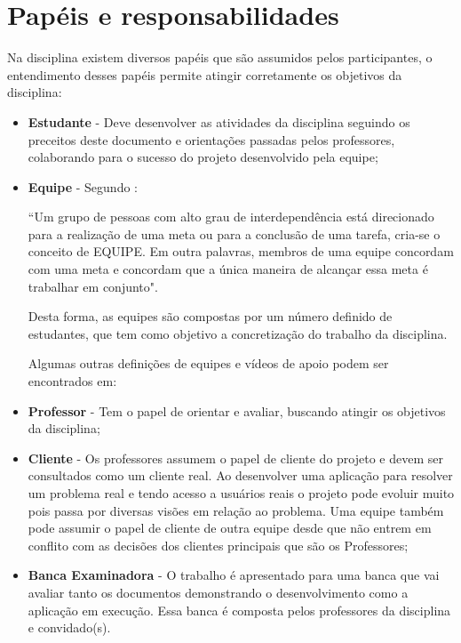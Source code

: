 \section{Papéis e responsabilidades}

Na disciplina existem diversos papéis que são assumidos pelos participantes, o entendimento desses papéis permite atingir corretamente os objetivos da disciplina:
\begin{itemize}
    \item \textbf{Estudante} - Deve desenvolver as atividades da disciplina seguindo os preceitos deste documento e orientações passadas pelos professores, colaborando para o sucesso do projeto desenvolvido pela equipe;


    \item \textbf{Equipe} - Segundo \cite{EQUIPES}: 
    \begin{citacao}“Um grupo de pessoas com alto grau de interdependência está direcionado para a realização de uma meta ou para a conclusão de uma tarefa, cria-se o conceito de EQUIPE. Em outra palavras, membros de uma equipe concordam com uma meta e concordam que a única maneira de alcançar essa meta é trabalhar em conjunto". 
    \end{citacao}
    Desta forma, as equipes são compostas por um número definido de estudantes, que tem como objetivo a concretização do trabalho da disciplina.
    
    Algumas outras definições de equipes e vídeos de apoio podem ser encontrados em: 
    

    \item \textbf{Professor} - Tem o papel de orientar e avaliar, buscando atingir os objetivos da disciplina;
    
    

    \item \textbf{Cliente} - Os professores assumem o papel de cliente do projeto e devem ser consultados como um cliente real. Ao desenvolver uma aplicação para resolver um problema real e tendo acesso a usuários reais o projeto pode evoluir muito pois passa por diversas visões em relação ao problema. Uma equipe também pode assumir o papel de cliente de outra equipe desde que não entrem em conflito com as decisões dos clientes principais que são os Professores;

    \item \textbf{Banca Examinadora} - O trabalho é apresentado para uma banca que vai avaliar tanto os documentos demonstrando o desenvolvimento como a aplicação em execução. Essa banca é composta pelos professores da disciplina e convidado(s).
    
\end{itemize}


